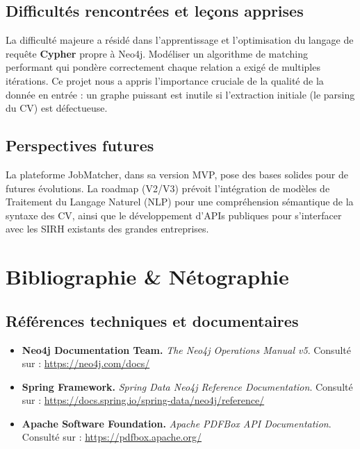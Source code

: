 \documentclass[12pt,a4paper]{report}
\begin{document}
\begin{itemize}
\section*{Difficultés rencontrées et leçons apprises}
La difficulté majeure a résidé dans l'apprentissage et l'optimisation du langage de requête \textbf{Cypher} propre à Neo4j. Modéliser un algorithme de matching performant qui pondère correctement chaque relation a exigé de multiples itérations. Ce projet nous a appris l'importance cruciale de la qualité de la donnée en entrée : un graphe puissant est inutile si l'extraction initiale (le parsing du CV) est défectueuse.

\section*{Perspectives futures}
La plateforme JobMatcher, dans sa version MVP, pose des bases solides pour de futures évolutions. La roadmap (V2/V3) prévoit l'intégration de modèles de Traitement du Langage Naturel (NLP) pour une compréhension sémantique de la syntaxe des CV, ainsi que le développement d'APIs publiques pour s'interfacer avec les SIRH existants des grandes entreprises.

\chapter*{Bibliographie \& Nétographie}

\section*{Références techniques et documentaires}
\begin{itemize}
    \item \textbf{Neo4j Documentation Team.} \textit{The Neo4j Operations Manual v5}. Consulté sur : \url{https://neo4j.com/docs/}
    \item \textbf{Spring Framework.} \textit{Spring Data Neo4j Reference Documentation}. Consulté sur : \url{https://docs.spring.io/spring-data/neo4j/reference/}
    \item \textbf{Apache Software Foundation.} \textit{Apache PDFBox API Documentation}. Consulté sur : \url{https://pdfbox.apache.org/}
\end{itemize}


\end{itemize}
\end{document}
